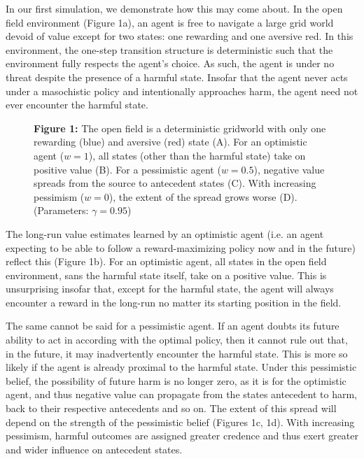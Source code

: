 \documentclass[11pt]{article} %
\begin{document}
In our first simulation, we demonstrate how this may come about. In the open field environment (Figure 1a), an agent is free to navigate a large grid world devoid of value except for two states: one rewarding and one aversive red. In this environment, the one-step transition structure is deterministic such that the environment fully respects the agent's choice. As such, the agent is under no threat despite the presence of a harmful state. Insofar that the agent never acts under a masochistic policy and intentionally approaches harm, the agent need not ever encounter the harmful state.

\begin{figure}
  \centerline{%
  }
  \par \textbf{Figure 1:} The open field is a deterministic gridworld with only one rewarding (blue) and aversive (red) state (A). For an optimistic agent ($w=1$), all states (other than the harmful state) take on positive value (B). For a pessimistic agent ($w=0.5$), negative value spreads from the source to antecedent states (C). With increasing pessimism ($w=0$), the extent of the spread grows worse (D). (Parameters: $\gamma = 0.95$)
\end{figure}

The long-run value estimates learned by an optimistic agent (i.e. an agent expecting to be able to follow a reward-maximizing policy now and in the future) reflect this (Figure 1b). For an optimistic agent, all states in the open field environment, sans the harmful state itself, take on a positive value. This is unsurprising insofar that, except for the harmful state, the agent will always encounter a reward in the long-run no matter its starting position in the field.

The same cannot be said for a pessimistic agent. If an agent doubts its future ability to act in according with the optimal policy, then it cannot rule out that, in the future, it may inadvertently encounter the harmful state. This is more so likely if the agent is already proximal to the harmful state. Under this pessimistic belief, the possibility of future harm is no longer zero, as it is for the optimistic agent, and thus negative value can propagate from the states antecedent to harm, back to their respective antecedents and so on. The extent of this spread will depend on the strength of the pessimistic belief (Figures 1c, 1d). With increasing pessimism, harmful outcomes are assigned greater credence and thus exert greater and wider influence on antecedent states.
\end{document}
